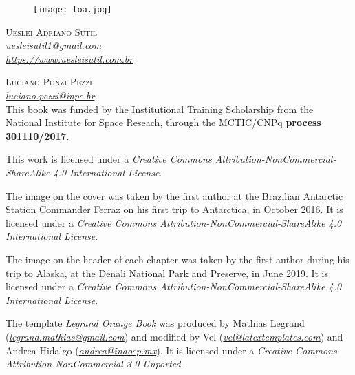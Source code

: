 \newpage
\thispagestyle{empty}

\begin{figure}[H]
    \centering
    \vspace*{\fill}
    \texttt{[image: loa.jpg]}
    \vspace{1cm}
\end{figure}


\noindent \textsc{Ueslei Adriano Sutil} 
\\
\noindent \textcolor{bleu_cite}{\href{uesleisutil1@gmail.com}{\textit{uesleisutil1@gmail.com}}}
\\  %
\noindent \textcolor{bleu_cite}{\href{https://www.uesleisutil.com.br}{\textit{https://www.uesleisutil.com.br}}}
\bigskip

\noindent \textsc{Luciano Ponzi Pezzi}
\\
\noindent \textcolor{bleu_cite}{\href{luciano.pezzi@inpe.br}{\textit{luciano.pezzi@inpe.br}}}  %
\bigskip
\\

\noindent This book was funded by the Institutional Training Scholarship from the National Institute for Space Reseach, through the MCTIC/CNPq \textbf{process 301110/2017}.
\bigskip

\noindent This work is licensed under a \textit{Creative Commons Attribution-NonCommercial-ShareAlike 4.0 International License}.
\bigskip

\noindent The image on the cover was taken by the first author at the Brazilian Antarctic Station Commander Ferraz on his first trip to Antarctica,
          in October 2016. It is licensed under a \textit{Creative Commons Attribution-NonCommercial-ShareAlike 4.0 International License}. 
\bigskip

\noindent The image on the header of each chapter was taken by the first author during his trip to Alaska, at the Denali National Park and Preserve, in June 2019. 
          It is licensed under a \textit{Creative Commons Attribution-NonCommercial-ShareAlike 4.0 International License}. 
\bigskip

\noindent The template \textit{Legrand Orange Book} was produced by Mathias Legrand (\textcolor{bleu_cite}{\href{legrand.mathias@gmail.com}{\textit{legrand.mathias@gmail.com}}}) 
          and modified by Vel (\textcolor{bleu_cite}{\href{vel@latextemplates.com}{\textit{vel@latextemplates.com}}}) and Andrea Hidalgo (\textcolor{bleu_cite}{\href{andrea@inaoep.mx}{\textit{andrea@inaoep.mx}}}). 
          It is licensed under a \textit{Creative Commons Attribution-NonCommercial 3.0 Unported}.
\bigskip

